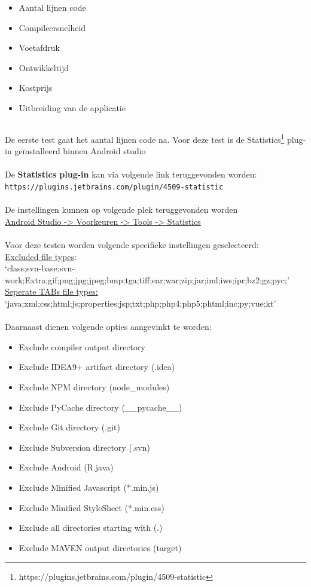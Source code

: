 \begin{itemize}
    \item Aantal lijnen code
    \item Compileersnelheid
    \item Voetafdruk
    \item Ontwikkeltijd
    \item Kostprijs
    \item Uitbreiding van de applicatie
\end{itemize}

\subsection{}
\label{sec:M-test-lijnen-code}
De eerste test gaat het aantal lijnen code na. Voor deze test is de Statistics\footnote{https://plugins.jetbrains.com/plugin/4509-statistic} plug-in geïnstalleerd binnen Android studio
\\ \\
De \textbf{Statistics plug-in} kan via volgende link teruggevonden worden:\\
\verb*|https://plugins.jetbrains.com/plugin/4509-statistic|
\\ \\
De instellingen kunnen op volgende plek teruggevonden worden \\ 
\underline{Android Studio -> Voorkeuren -> Tools -> Statistics}
\\ \\
Voor deze testen worden volgende specifieke instellingen geselecteerd: \\
\underline{Excluded file types}:\\ `class;svn-base;svn-work;Extra;gif;png;jpg;jpeg;bmp;tga;tiff;ear;war;zip;jar;iml;iws;ipr;bz2;gz;pyc;'
\underline{Seperate TABs file types:}\\
`java;xml;css;html;js;properties;jsp;txt;php;php4;php5;phtml;inc;py;vue;kt'
\\ \\
Daarnaast dienen volgende opties aangevinkt te worden:\\
\begin{itemize}
    \item Exclude compiler output directory
    \item Exclude IDEA9+ artifact directory (.idea)
    \item Exclude NPM directory (node\_modules)
    \item Exclude PyCache directory (\_\_pycache\_\_)
    \item Exclude Git directory (.git)
    \item Exclude Subversion directory (.svn)
    \item Exclude Android (R.java)
    \item Exclude Minified Javascript (*.min.js)
    \item Exclude Minified StyleSheet (*.min.css)
    \item Exclude all directories starting with (.)
    \item Exclude MAVEN output directories (target)
\end{itemize}

